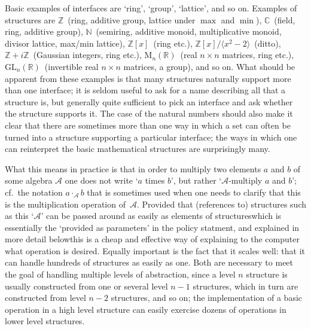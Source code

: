 \documentclass{mtmtcl}
\theoremstyle{plain}
\theoremstyle{remark}
\begin{document}
Basic examples of interfaces are `ring', `group', `lattice', and so 
on. Examples of structures are $\mathbb{Z}$~(ring, additive group, 
lattice under $\max$ and $\min$), $\mathbb{C}$~(field, ring, additive 
group), $\mathbb{N}$~(semiring, additive monoid, multiplicative 
monoid, divisor lattice, max/min lattice), $\mathbb{Z}[x]$~(ring etc.), 
$\mathbb{Z}[x]\big/ \langle x^2 - 2\rangle$~(ditto), $\mathbb{Z} + 
i\mathbb{Z}$~(Gaussian integers, ring etc.), 
$\mathrm{M}_n(\mathbb{R})$~(real $n \times n$ matrices, ring etc.), 
$\mathrm{GL}_n(\mathbb{R})$~(invertible real $n \times n$ matrices, a 
group), and so on. What should be apparent from these examples is 
that many structures naturally support more than one interface; it is 
seldom useful to ask for a name describing all that a structure is, 
but generally quite sufficient to pick an interface and ask whether 
the structure supports it. The case of the natural numbers should 
also make it clear that there are sometimes more than one way in which 
a set can often be turned into a structure supporting a particular 
interface; the ways in which one can reinterpret the basic 
mathematical structures are surprisingly many.

What this means in practice is that in order to multiply two 
elements $a$ and $b$ of some algebra $\mathcal{A}$ one does not 
write `$a$ times $b$', but rather `$\mathcal{A}$-multiply $a$ and 
$b$'; cf.~the notation \(a \cdot_{\mathcal{A}} b\) that is 
sometimes used when one needs to clarify that this is the 
multiplication operation of~$\mathcal{A}$. Provided that (references 
to) structures such as this `$\mathcal{A}$' can be passed around as 
easily as elements of structures\Ldash which is essentially the 
`provided as parameters' in the policy statment, and explained in 
more detail below\Rdash this is a cheap and effective way of 
explaining to the computer what operation is desired. Equally 
important is the fact that it scales well: that it can handle 
hundreds of structures as easily as one. Both are necessary to meet 
the goal of handling multiple levels of abstraction, since a level 
$n$ structure is usually constructed from one or several level $n-1$ 
structures, which in turn are constructed from level $n-2$ 
structures, and so on; the implementation of a basic operation in 
a high level structure can easily exercise dozens of operations in 
lower level structures.
\end{document}
